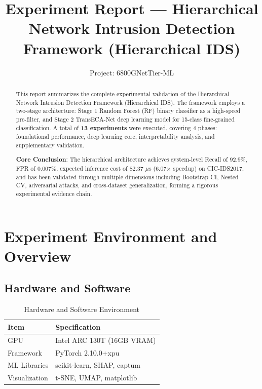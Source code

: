 \documentclass[sigconf]{acmart}
\begin{document}
\title{Experiment Report --- Hierarchical Network Intrusion Detection Framework (Hierarchical IDS)}

\author{Project: 6800GNetTier-ML}
\affiliation{%
  \institution{}
  \country{}
}

\begin{abstract}
This report summarizes the complete experimental validation of the Hierarchical Network Intrusion Detection Framework (Hierarchical IDS). The framework employs a two-stage architecture: Stage 1 Random Forest (RF) binary classifier as a high-speed pre-filter, and Stage 2 TransECA-Net deep learning model for 15-class fine-grained classification. A total of \textbf{13 experiments} were executed, covering 4 phases: foundational performance, deep learning core, interpretability analysis, and supplementary validation.

\textbf{Core Conclusion}: The hierarchical architecture achieves system-level Recall of 92.9\%, FPR of 0.007\%, expected inference cost of 82.37 $\mu$s (6.07$\times$ speedup) on CIC-IDS2017, and has been validated through multiple dimensions including Bootstrap CI, Nested CV, adversarial attacks, and cross-dataset generalization, forming a rigorous experimental evidence chain.
\end{abstract}

\maketitle

\section{Experiment Environment and Overview}

\subsection{Hardware and Software}

\begin{table}[!h]
\caption{Hardware and Software Environment}
\label{tab:hardware}
\begin{tabular}{ll}
\toprule
\textbf{Item} & \textbf{Specification} \\
\midrule
GPU & Intel ARC 130T (16GB VRAM) \\
Framework & PyTorch 2.10.0+xpu \\
ML Libraries & scikit-learn, SHAP, captum \\
Visualization & t-SNE, UMAP, matplotlib \\
\bottomrule
\end{tabular}
\end{table}
\end{document}
